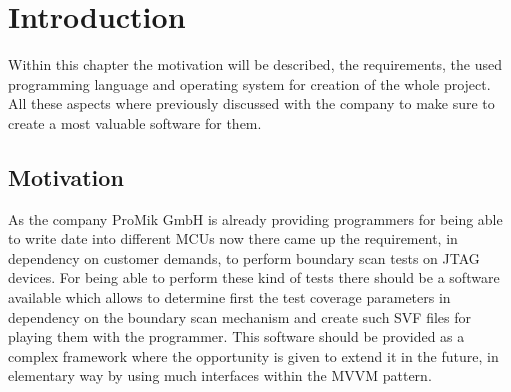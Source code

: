 \chapter{Introduction}
Within this chapter the motivation will be described, the requirements, the used programming language and operating system for creation of the whole project. All these aspects where previously discussed with the company to make sure to create a most valuable software for them.

	\section{Motivation}
As the company ProMik GmbH is already providing programmers for being able to write date into different \ac{MCU}s now there came up the requirement, in dependency on customer demands, to perform boundary scan tests on \ac{JTAG} devices.\cite{.4132021} For being able to perform these kind of tests there should be a software available which allows to determine first the test coverage parameters in dependency on the boundary scan mechanism and create such \ac{SVF} files for playing them with the programmer. This software should be provided as a complex framework where the opportunity is given to extend it in the future, in elementary way by using much interfaces within the \ac{MVVM} pattern.

